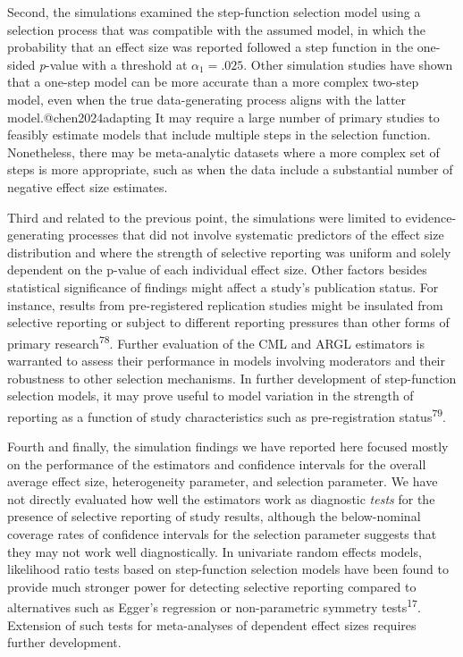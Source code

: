 \documentclass[
  american,
  man, donotrepeattitle,floatsintext]{apa7}
\begin{document}
Second, the simulations examined the step-function selection model using a selection process that was compatible with the assumed model, in which the probability that an effect size was reported followed a step function in the one-sided \emph{p}-value with a threshold at \(\alpha_1 = .025\).
Other simulation studies have shown that a one-step model can be more accurate than a more complex two-step model, even when the true data-generating process aligns with the latter model.@chen2024adapting
It may require a large number of primary studies to feasibly estimate models that include multiple steps in the selection function.
Nonetheless, there may be meta-analytic datasets where a more complex set of steps is more appropriate, such as when the data include a substantial number of negative effect size estimates.

Third and related to the previous point, the simulations were limited to evidence-generating processes that did not involve systematic predictors of the effect size distribution and where the strength of selective reporting was uniform and solely dependent on the p-value of each individual effect size.
Other factors besides statistical significance of findings might affect a study's publication status.
For instance, results from pre-registered replication studies might be insulated from selective reporting or subject to different reporting pressures than other forms of primary research\textsuperscript{78}.
Further evaluation of the CML and ARGL estimators is warranted to assess their performance in models involving moderators and their robustness to other selection mechanisms.
In further development of step-function selection models, it may prove useful to model variation in the strength of reporting as a function of study characteristics such as pre-registration status\textsuperscript{79}.

Fourth and finally, the simulation findings we have reported here focused mostly on the performance of the estimators and confidence intervals for the overall average effect size, heterogeneity parameter, and selection parameter.
We have not directly evaluated how well the estimators work as diagnostic \emph{tests} for the presence of selective reporting of study results, although the below-nominal coverage rates of confidence intervals for the selection parameter suggests that they may not work well diagnostically.
In univariate random effects models, likelihood ratio tests based on step-function selection models have been found to provide much stronger power for detecting selective reporting compared to alternatives such as Egger's regression or non-parametric symmetry tests\textsuperscript{17}.
Extension of such tests for meta-analyses of dependent effect sizes requires further development.
\end{document}
